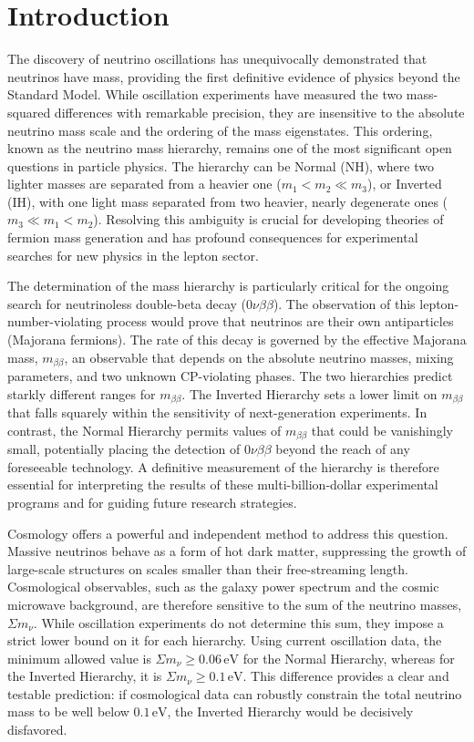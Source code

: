 \documentclass[]{article}
\begin{document}
\section{Introduction}
\label{sec:intro}
The discovery of neutrino oscillations has unequivocally demonstrated that neutrinos have mass, providing the first definitive evidence of physics beyond the Standard Model. While oscillation experiments have measured the two mass-squared differences with remarkable precision, they are insensitive to the absolute neutrino mass scale and the ordering of the mass eigenstates. This ordering, known as the neutrino mass hierarchy, remains one of the most significant open questions in particle physics. The hierarchy can be Normal (NH), where two lighter masses are separated from a heavier one ($m_1 < m_2 \ll m_3$), or Inverted (IH), with one light mass separated from two heavier, nearly degenerate ones ($m_3 \ll m_1 < m_2$). Resolving this ambiguity is crucial for developing theories of fermion mass generation and has profound consequences for experimental searches for new physics in the lepton sector.

The determination of the mass hierarchy is particularly critical for the ongoing search for neutrinoless double-beta decay ($0\nu\beta\beta$). The observation of this lepton-number-violating process would prove that neutrinos are their own antiparticles (Majorana fermions). The rate of this decay is governed by the effective Majorana mass, $m_{\beta\beta}$, an observable that depends on the absolute neutrino masses, mixing parameters, and two unknown CP-violating phases. The two hierarchies predict starkly different ranges for $m_{\beta\beta}$. The Inverted Hierarchy sets a lower limit on $m_{\beta\beta}$ that falls squarely within the sensitivity of next-generation experiments. In contrast, the Normal Hierarchy permits values of $m_{\beta\beta}$ that could be vanishingly small, potentially placing the detection of $0\nu\beta\beta$ beyond the reach of any foreseeable technology. A definitive measurement of the hierarchy is therefore essential for interpreting the results of these multi-billion-dollar experimental programs and for guiding future research strategies.

Cosmology offers a powerful and independent method to address this question. Massive neutrinos behave as a form of hot dark matter, suppressing the growth of large-scale structures on scales smaller than their free-streaming length. Cosmological observables, such as the galaxy power spectrum and the cosmic microwave background, are therefore sensitive to the sum of the neutrino masses, $\Sigma m_\nu$. While oscillation experiments do not determine this sum, they impose a strict lower bound on it for each hierarchy. Using current oscillation data, the minimum allowed value is $\Sigma m_\nu \ge 0.06\,\text{eV}$ for the Normal Hierarchy, whereas for the Inverted Hierarchy, it is $\Sigma m_\nu \ge 0.1\,\text{eV}$. This difference provides a clear and testable prediction: if cosmological data can robustly constrain the total neutrino mass to be well below $0.1\,\text{eV}$, the Inverted Hierarchy would be decisively disfavored.
\end{document}
